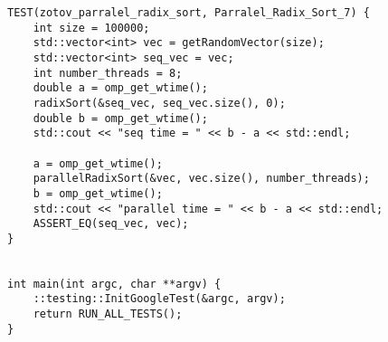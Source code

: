 \documentclass{report}
\begin{document}
\begin{lstlisting}
TEST(zotov_parralel_radix_sort, Parralel_Radix_Sort_7) {
    int size = 100000;
    std::vector<int> vec = getRandomVector(size);
    std::vector<int> seq_vec = vec;
    int number_threads = 8;
    double a = omp_get_wtime();
    radixSort(&seq_vec, seq_vec.size(), 0);
    double b = omp_get_wtime();
    std::cout << "seq time = " << b - a << std::endl;

    a = omp_get_wtime();
    parallelRadixSort(&vec, vec.size(), number_threads);
    b = omp_get_wtime();
    std::cout << "parallel time = " << b - a << std::endl;
    ASSERT_EQ(seq_vec, vec);
}


int main(int argc, char **argv) {
    ::testing::InitGoogleTest(&argc, argv);
    return RUN_ALL_TESTS();
}
\end{lstlisting}
\end{document}
